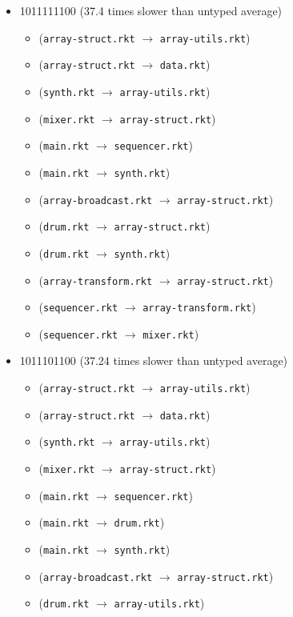 \documentclass{article}
\newcommand{\mono}[1]{\texttt{#1}}
\begin{document}
\begin{itemize}
\begin{itemize}
  \end{itemize}
\item 1011111100 (37.4 times slower than untyped average)
  \begin{itemize}
  \item (\mono{array-struct.rkt} $\rightarrow$ \mono{array-utils.rkt})
  \item (\mono{array-struct.rkt} $\rightarrow$ \mono{data.rkt})
  \item (\mono{synth.rkt} $\rightarrow$ \mono{array-utils.rkt})
  \item (\mono{mixer.rkt} $\rightarrow$ \mono{array-struct.rkt})
  \item (\mono{main.rkt} $\rightarrow$ \mono{sequencer.rkt})
  \item (\mono{main.rkt} $\rightarrow$ \mono{synth.rkt})
  \item (\mono{array-broadcast.rkt} $\rightarrow$ \mono{array-struct.rkt})
  \item (\mono{drum.rkt} $\rightarrow$ \mono{array-struct.rkt})
  \item (\mono{drum.rkt} $\rightarrow$ \mono{synth.rkt})
  \item (\mono{array-transform.rkt} $\rightarrow$ \mono{array-struct.rkt})
  \item (\mono{sequencer.rkt} $\rightarrow$ \mono{array-transform.rkt})
  \item (\mono{sequencer.rkt} $\rightarrow$ \mono{mixer.rkt})
  \end{itemize}
\item 1011101100 (37.24 times slower than untyped average)
  \begin{itemize}
  \item (\mono{array-struct.rkt} $\rightarrow$ \mono{array-utils.rkt})
  \item (\mono{array-struct.rkt} $\rightarrow$ \mono{data.rkt})
  \item (\mono{synth.rkt} $\rightarrow$ \mono{array-utils.rkt})
  \item (\mono{mixer.rkt} $\rightarrow$ \mono{array-struct.rkt})
  \item (\mono{main.rkt} $\rightarrow$ \mono{sequencer.rkt})
  \item (\mono{main.rkt} $\rightarrow$ \mono{drum.rkt})
  \item (\mono{main.rkt} $\rightarrow$ \mono{synth.rkt})
  \item (\mono{array-broadcast.rkt} $\rightarrow$ \mono{array-struct.rkt})
  \item (\mono{drum.rkt} $\rightarrow$ \mono{array-utils.rkt})

\end{itemize}
\end{itemize}
\end{document}
